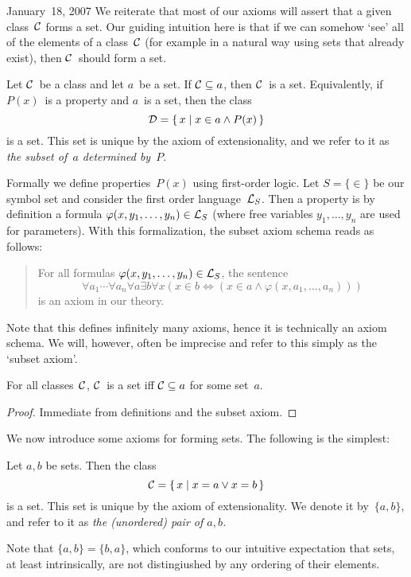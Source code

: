 \begin{lecture}{January~18, 2007}
We reiterate that most of our axioms will assert that a given class~\(\mathcal{C}\) forms a set. Our guiding intuition here is that if we can somehow `see' all of the elements of a class~\(\mathcal{C}\) (for example in a natural way using sets that already exist), then \(\mathcal{C}\)~should form a set.

\begin{axm}
Let \(\mathcal{C}\)~be a class and let \(a\)~be a set. If \(\mathcal{C}\subseteq a\), then \(\mathcal{C}\)~is a set. Equivalently, if \(P(x)\)~is a property and \(a\)~is a set, then the class
\[\mathcal{D}=\{\,x\mid x\in a\land P(x)\,\}\]
is a set. This set is unique by the axiom of extensionality, and we refer to it as \emph{the subset of~\(a\) determined by~\(P\)}.
\end{axm}

\begin{rmk}
Formally we define properties~\(P(x)\) using first-order logic. Let \(S=\{\in\}\) be our symbol set and consider the first order language~\(\mathcal{L}_S\). Then a property is by definition a formula \(\varphi(x,y_1,\ldots,y_n)\in\mathcal{L}_S\) (where free variables \(y_1,\ldots,y_n\) are used for parameters). With this formalization, the subset axiom schema reads as follows:
\begin{quote}
For all formulas \(\varphi(x,y_1,\ldots,y_n)\in\mathcal{L}_S\), the sentence
\[\forall a_1\cdots\forall a_n\forall a\exists b\forall x(x\in b\iff(x\in a\land\varphi(x,a_1,\ldots,a_n)))\]
is an axiom in our theory.
\end{quote}
Note that this defines infinitely many axioms, hence it is technically an axiom schema. We will, however, often be imprecise and refer to this simply as the `subset axiom'.
\end{rmk}

\begin{cor}
For all classes~\(\mathcal{C}\), \(\mathcal{C}\)~is a set iff \(\mathcal{C}\subseteq a\) for some set~\(a\).
\end{cor}
\begin{proof}
Immediate from definitions and the subset axiom.
\end{proof}

We now introduce some axioms for forming sets. The following is the simplest:
\begin{axm}[Pairing]
Let \(a,b\) be sets. Then the class
\[\mathcal{C}=\{\,x\mid x=a\lor x=b\,\}\]
is a set. This set is unique by the axiom of extensionality. We denote it by~\(\{a,b\}\), and refer to it as \emph{the (unordered) pair of \(a,b\).}
\end{axm}
\noindent Note that \(\{a,b\}=\{b,a\}\), which conforms to our intuitive expectation that sets, at least intrinsically, are not distingiushed by any ordering of their elements.


\end{lecture}
